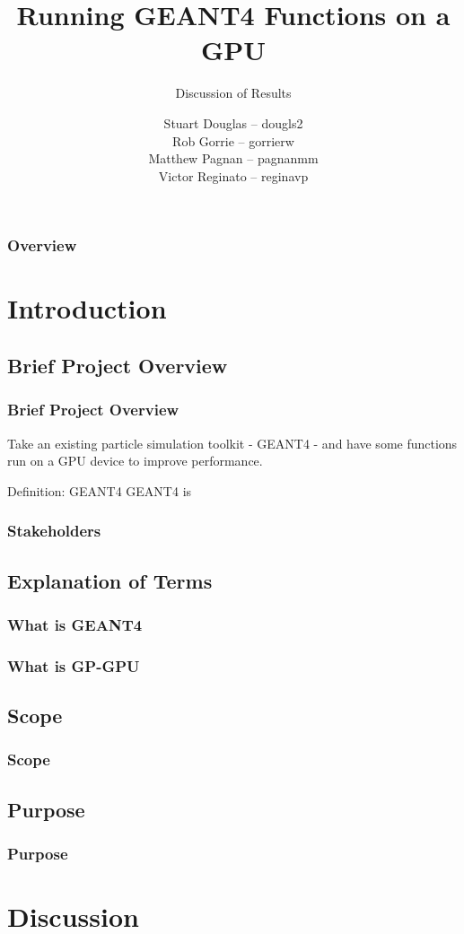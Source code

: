 \documentclass{beamer}
\title[GEANT4-GPU (McMaster University)]{Running GEANT4 Functions on a GPU}
\subtitle{Discussion of Results}
\institute{McMaster University}
\author[S. Douglas, R. Gorrie, M .Pagnan, V. Reginato]{
Stuart Douglas -- dougls2
\\Rob Gorrie -- gorrierw
\\Matthew Pagnan -- pagnanmm
\\Victor Reginato -- reginavp
}
\begin{document}
\frame{\titlepage}
\begin{frame}
\frametitle{Overview}
\tableofcontents
\end{frame}

\section{Introduction} 

\subsection{Brief Project Overview}
\begin{frame}
\frametitle{Brief Project Overview}
Take an existing particle simulation toolkit - GEANT4 - and have some functions run on a GPU device to improve performance.
\begin{block}{Definition: GEANT4}
GEANT4 is 
\end{block}
\end{frame}

\begin{frame}
\frametitle{Stakeholders}
\end{frame}

\subsection{Explanation of Terms}
\begin{frame}
\frametitle{What is GEANT4}
\end{frame}

\begin{frame}
\frametitle{What is GP-GPU}
\end{frame}

\subsection{Scope}
\begin{frame}
\frametitle{Scope}
\end{frame}

\subsection{Purpose}
\begin{frame}
\frametitle{Purpose}
\end{frame}

\section{Discussion}
\end{document}
